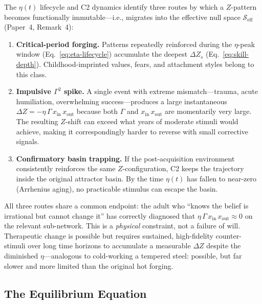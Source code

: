 \documentclass[aps,pre,twocolumn,superscriptaddress,floatfix]{revtex4-2}
\begin{document}
\begin{remark}
\label{rem:fixation-mechanisms}
The $\eta(t)$ lifecycle and C2 dynamics identify three
routes by which a $Z$-pattern becomes functionally
immutable---i.e., migrates into the effective null space
$\mathcal{S}_{\text{eff}}$ (Paper~4, Remark~4):
\begin{enumerate}
  \item \textbf{Critical-period forging.}
    Patterns repeatedly reinforced during the
    $\eta$-peak window (Eq.~\ref{eq:eta-lifecycle})
    accumulate the deepest $\Delta Z_s$
    (Eq.~\ref{eq:skill-depth}).
    Childhood-imprinted values, fears, and attachment
    styles belong to this class.
  \item \textbf{Impulsive $\Gamma^2$ spike.}
    A single event with extreme mismatch---trauma, acute
    humiliation, overwhelming success---produces a large
    instantaneous
    $\Delta Z = -\eta\,\Gamma\,x_{\text{in}}\,x_{\text{out}}$
    because both $\Gamma$ and $x_{\text{in}}\,x_{\text{out}}$
    are momentarily very large.
    The resulting $Z$-shift can exceed what years of
    moderate stimuli would achieve, making it
    correspondingly harder to reverse with small corrective
    signals.
  \item \textbf{Confirmatory basin trapping.}
    If the post-acquisition environment consistently
    reinforces the same $Z$-configuration, C2 keeps
    the trajectory inside the original attractor basin.
    By the time $\eta(t)$ has fallen to near-zero
    (Arrhenius aging), no practicable stimulus can
    escape the basin.
\end{enumerate}
All three routes share a common endpoint: the adult who
``knows the belief is irrational but cannot change it''
has correctly diagnosed that
$\eta\,\Gamma\,x_{\text{in}}\,x_{\text{out}}\approx 0$
on the relevant sub-network.
This is a \emph{physical} constraint, not a failure of will.
Therapeutic change is possible but requires sustained,
high-fidelity counter-stimuli over long time horizons to
accumulate a measurable $\Delta Z$ despite the diminished
$\eta$---analogous to cold-working a tempered steel:
possible, but far slower and more limited than the original
hot forging.
\end{remark}


\subsection{The Equilibrium Equation}
\end{document}
